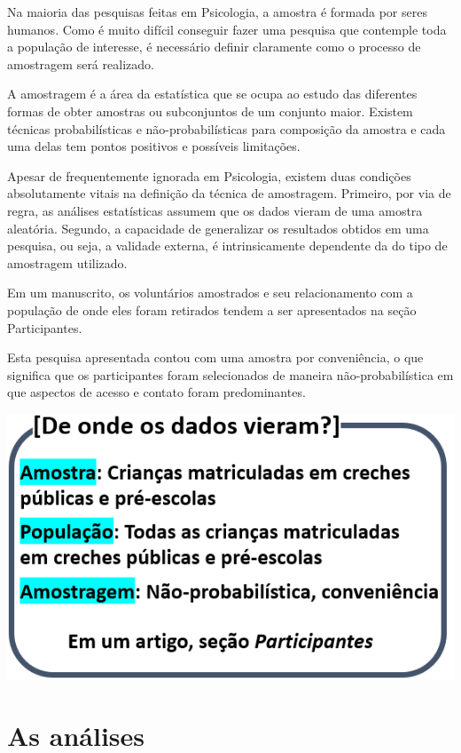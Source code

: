 \documentclass[
]{book}
\begin{document}
Na maioria das pesquisas feitas em Psicologia, a amostra é formada por seres humanos. Como é muito difícil conseguir fazer uma pesquisa que contemple toda a população de interesse, é necessário definir claramente como o processo de amostragem será realizado.

A amostragem é a área da estatística que se ocupa ao estudo das diferentes formas de obter amostras ou subconjuntos de um conjunto maior. Existem técnicas probabilísticas e não-probabilísticas para composição da amostra e cada uma delas tem pontos positivos e possíveis limitações.

Apesar de frequentemente ignorada em Psicologia, existem duas condições absolutamente vitais na definição da técnica de amostragem. Primeiro, por via de regra, as análises estatísticas assumem que os dados vieram de uma amostra aleatória. Segundo, a capacidade de generalizar os resultados obtidos em uma pesquisa, ou seja, a validade externa, é intrinsicamente dependente da do tipo de amostragem utilizado.

Em um manuscrito, os voluntários amostrados e seu relacionamento com a população de onde eles foram retirados tendem a ser apresentados na seção Participantes.

Esta pesquisa apresentada contou com uma amostra por conveniência, o que significa que os participantes foram selecionados de maneira não-probabilística em que aspectos de acesso e contato foram predominantes.

\includegraphics{./img/cap_pesquisa_aplicada_onde.png}

\hypertarget{as-anuxe1lises}{%
\section{As análises}\label{as-anuxe1lises}}
\end{document}
